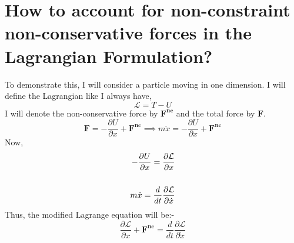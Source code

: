 \documentclass[12pt]{article}
\begin{document}
    \section{How to account for non-constraint non-conservative forces in the Lagrangian Formulation?}
    To demonstrate this, I will consider a particle moving in one dimension. I will define the Lagrangian like I always have,
    \begin{equation}
        \mathcal{L}=T-U
    \end{equation}
    I will denote the non-conservative force by $\mathbf{F^{nc}}$ and the total force by $\mathbf{F}$.
    \begin{equation}
        \mathbf{F}=-\frac{\partial U}{\partial x}+\mathbf{F^{nc}}\implies m\ddot{x}=-\frac{\partial U}{\partial x}+\mathbf{F^{nc}}
    \end{equation}
    Now,
    \begin{align}
        -\frac{\partial U}{\partial x}=\frac{\partial \mathcal{L}}{\partial x}\\ \notag \\ m\ddot{x}=\frac{d}{dt}\frac{\partial \mathcal{L}}{\partial \dot{x}}
    \end{align}
    Thus, the modified Lagrange equation will be:-
    \begin{equation}
        \frac{\partial \mathcal{L}}{\partial x}+\mathbf{F^{nc}}=\frac{d}{dt}\frac{\partial \mathcal{L}}{\partial \dot{x}}
    \end{equation}
\end{document}
